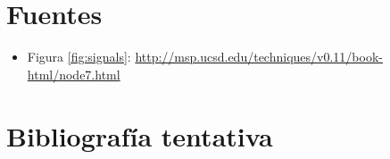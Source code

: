 \documentclass[a4paper,spanish,12pt]{article}
\begin{document}


    
    \maketitle
    

\newpage

\newpage

\newpage


\newpage\section{Fuentes}
\begin{itemize}
\item Figura \ref{fig:signals}: \url{http://msp.ucsd.edu/techniques/v0.11/book-html/node7.html}
\end{itemize}

\newpage\section{Bibliografía tentativa}
\end{document}
